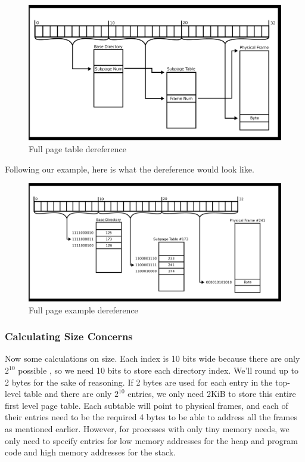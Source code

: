 \begin{figure}[H]
  \centering
  \includegraphics[width=1.0\textwidth]{ipc/drawings/multi_level_split.eps}
  \caption{Full page table dereference}
\end{figure}

Following our example, here is what the dereference would look like.

\begin{figure}[H]
  \centering
  \includegraphics[width=1.0\textwidth]{ipc/drawings/multi_level_filled.eps}
  \caption{Full page example dereference}
\end{figure}

\subsubsection{Calculating Size Concerns}

Now some calculations on size.
Each  index is 10 bits wide because there are only $2^{10}$ possible , so we need 10 bits to store each directory index.
We'll round up to 2 bytes for the sake of reasoning.
If 2 bytes are used for each entry in the top-level table and there are only $2^{10}$ entries, we only need 2KiB to store this entire first level page table.
Each subtable will point to physical frames, and each of their entries need to be the required 4 bytes to be able to address all the frames as mentioned earlier.
However, for processes with only tiny memory needs, we only need to specify entries for low memory addresses for the heap and program code and high memory addresses for the stack.

